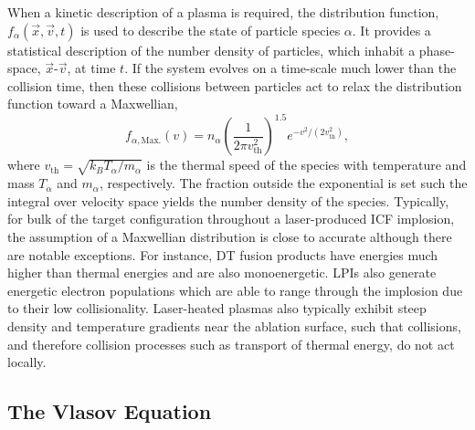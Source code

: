 When a kinetic description of a plasma is required, the distribution function, $f_{\alpha}(\vec{x},\vec{v},t)$ is used to describe the state of particle species $\alpha$.
It provides a statistical description of the number density of particles, which inhabit a phase-space, $\vec{x}$-$\vec{v}$, at time $t$.
If the system evolves on a time-scale much lower than the collision time, then these collisions between particles act to relax the distribution function toward a Maxwellian,
\begin{equation}
    f_{\alpha,\text{Max.}}(v) = n_{\alpha} {\left( \frac{1}{2\pi v_{\text{th}}^2} \right)}^{1.5} e^{-v^2/(2 v_{\text{th}}^2)},
\end{equation}
where $v_{\text{th}}=\sqrt{k_B T_{\alpha}/m_{\alpha}}$ is the thermal speed of the species with temperature and mass $T_{\alpha}$ and $m_{\alpha}$, respectively.
The fraction outside the exponential is set such the integral over velocity space yields the number density of the species.
Typically, for bulk of the target configuration throughout a laser-produced \ac{ICF} implosion, the assumption of a Maxwellian distribution is close to accurate although there are notable exceptions.
For instance, DT fusion products have energies much higher than thermal energies and are also monoenergetic.
\ac{LPIs} also generate energetic electron populations which are able to range through the implosion due to their low collisionality.
Laser-heated plasmas also typically exhibit steep density and temperature gradients near the ablation surface, such that collisions, and therefore collision processes such as transport of thermal energy, do not act locally.

\subsection{The Vlasov Equation}%
\label{sec:theory_vlasov}

